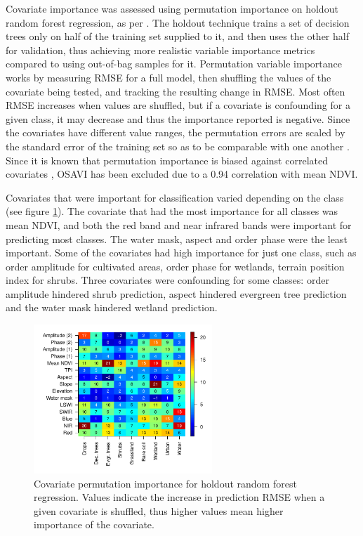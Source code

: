 \documentclass[a4paper,12pt]{scrbook}
\begin{document}
Covariate importance was assessed using permutation importance on holdout random forest regression, as per \citet{Janitza2016holdoutrf}. The holdout technique trains a set of decision trees only on half of the training set supplied to it, and then uses the other half for validation, thus achieving more realistic variable importance metrics compared to using out-of-bag samples for it. Permutation variable importance works by measuring RMSE for a full model, then shuffling the values of the covariate being tested, and tracking the resulting change in RMSE. Most often RMSE increases when values are shuffled, but if a covariate is confounding for a given class, it may decrease and thus the importance reported is negative. Since the covariates have different value ranges, the permutation errors are scaled by the standard error of the training set so as to be comparable with one another \citep{breiman2001random}. Since it is known that permutation importance is biased against correlated covariates \citep{tolosi2011importancebias}, OSAVI has been excluded due to a 0.94 correlation with mean NDVI. 

Covariates that were important for classification varied depending on the class (see figure \ref{fig-variable-importance}). The covariate that had the most importance for all classes was mean NDVI, and both the red band and near infrared bands were important for predicting most classes. The water mask, aspect and  order phase were the least important. Some of the covariates had high importance for just one class, such as  order amplitude for cultivated areas,  order phase for wetlands, terrain position index for shrubs. Three covariates were confounding for some classes:  order amplitude hindered shrub prediction, aspect hindered evergreen tree prediction and the water mask hindered wetland prediction.

\begin{figure}
  \centering
  \includegraphics[width=0.6\textwidth]{../plot/variable-importance}
  \caption{Covariate permutation importance for holdout random forest regression. Values indicate the increase in prediction RMSE when a given covariate is shuffled, thus higher values mean higher importance of the covariate.}
  \label{fig-variable-importance}
\end{figure}
\end{document}
